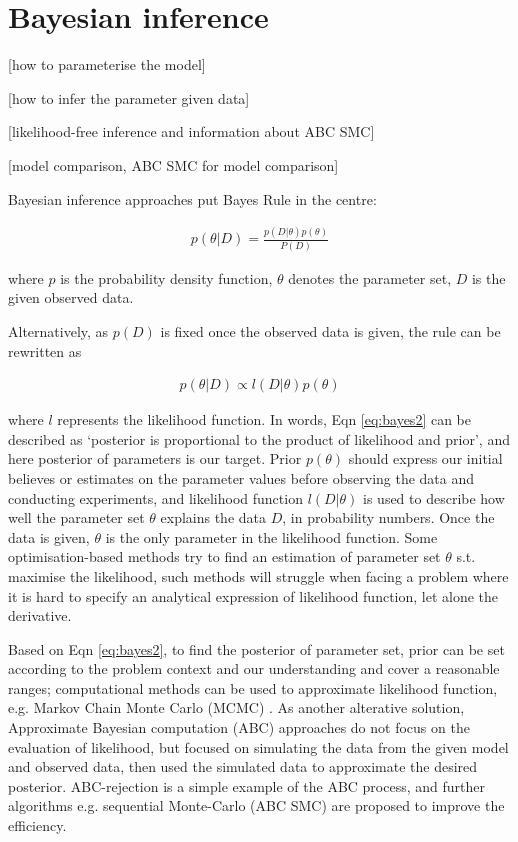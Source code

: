 \section{Bayesian inference}

 [how to parameterise the model]

 [how to infer the parameter given data]

 [likelihood-free inference and information about ABC SMC]

 [model comparison, ABC SMC for model comparison]

 Bayesian inference approaches put Bayes Rule in the centre:

 \begin{align}
    \label{eq:bayes}
    p(\theta|D) = \frac{p(D|\theta)p(\theta)}{P(D)}
\end{align}

where $p$ is the probability density function, $\theta$ denotes the parameter set, $D$ is the given observed data.

Alternatively, as $p(D)$ is fixed once the observed data is given, the rule can be rewritten as 

\begin{align}
    \label{eq:bayes2}
    p(\theta|D) \propto l(D|\theta)p(\theta)
\end{align}

where $l$ represents the likelihood function. In words, Eqn \ref{eq:bayes2} can be described as `posterior is proportional to the product of likelihood and prior', and here posterior of parameters is our target. Prior $p(\theta)$ should express our initial believes or estimates on the parameter values before observing the data and conducting experiments, and likelihood function $l(D|\theta)$ is used to describe how well the parameter set $\theta$ explains the data $D$, in probability numbers. Once the data is given, $\theta$ is the only parameter in the likelihood function. Some optimisation-based methods try to find an estimation of parameter set $\theta$ s.t. maximise the likelihood, such methods will struggle when facing a problem where it is hard to specify an analytical expression of likelihood function, let alone the derivative.

Based on Eqn \ref{eq:bayes2}, to find the posterior of parameter set, prior can be set according to the problem context and our understanding and cover a reasonable ranges; computational methods can be used to approximate likelihood function, e.g. Markov Chain Monte Carlo (MCMC) \cite{ref:MCMC}. As another alterative solution, Approximate Bayesian computation (ABC) approaches do not focus on the evaluation of likelihood, but focused on simulating the data from the given model and observed data, then used the simulated data to approximate the desired posterior. ABC-rejection \cite{ABC_rejection} is a simple example of the ABC process, and further algorithms e.g. sequential Monte-Carlo (ABC SMC)\cite{Toni} are proposed to improve the efficiency.

